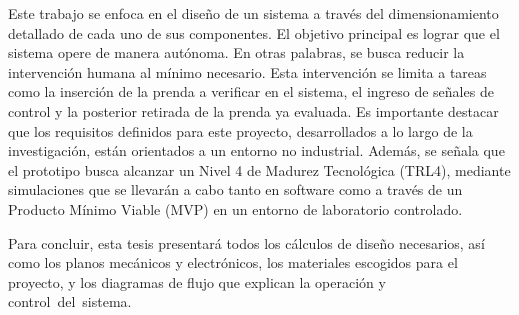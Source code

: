 Este trabajo se enfoca en el diseño de un sistema a través del dimensionamiento detallado de cada uno de sus componentes. El objetivo principal es lograr que el sistema opere de manera autónoma. En otras palabras, se busca reducir la intervención humana al mínimo necesario. Esta intervención se limita a tareas como la inserción de la prenda a verificar en el sistema, el ingreso de señales de control y la posterior retirada de la prenda ya evaluada. Es importante destacar que los requisitos definidos para este proyecto, desarrollados a lo largo de la investigación, están orientados a un entorno no industrial. Además, se señala que el prototipo busca alcanzar un Nivel 4 de Madurez Tecnológica (TRL4), mediante simulaciones que se llevarán a cabo tanto en software como a través de un Producto Mínimo Viable (MVP) en un entorno de laboratorio controlado.

Para concluir, esta tesis presentará todos los cálculos de diseño necesarios, así como los planos mecánicos y electrónicos, los materiales escogidos para el proyecto, y los diagramas de flujo que explican la operación y control del sistema.
